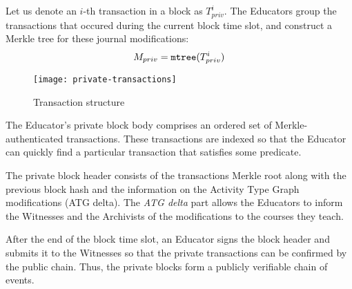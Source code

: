 Let us denote an $i$-th transaction in a block as $T_{priv}^i$. The Educators group the transactions that occured during the current block time slot, and construct a Merkle tree \cite{merkle1989certified} for these journal modifications:
\begin{equation}
M_{priv} = \mathtt{mtree}(T_{priv}^i)
\end{equation}

\begin{figure}[ht]
\centering
\texttt{[image: private-transactions]}
\caption{Transaction structure}
\label{fig:private-transactions}
\end{figure}



The Educator's private block body comprises an ordered set of Merkle-authenticated transactions. These transactions are indexed so that the Educator can quickly find a particular transaction that satisfies some predicate.

The private block header consists of the transactions Merkle root along with the previous block hash and the information on the Activity Type Graph modifications (ATG delta). The \textit{ATG delta} part allows the Educators to inform the Witnesses and the Archivists of the modifications to the courses they teach.

After the end of the block time slot, an Educator signs the block header and submits it to the Witnesses so that the private transactions can be confirmed by the public chain. Thus, the private blocks form a publicly verifiable chain of events.
